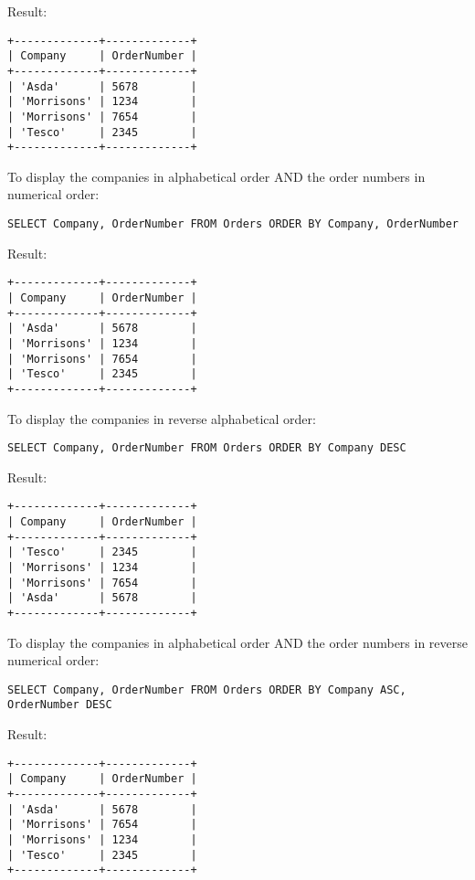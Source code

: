 \documentclass{howto}
\begin{document}
Result:
\begin{verbatim}
+-------------+-------------+
| Company     | OrderNumber |
+-------------+-------------+
| 'Asda'      | 5678        |
| 'Morrisons' | 1234        |
| 'Morrisons' | 7654        |
| 'Tesco'     | 2345        |
+-------------+-------------+
\end{verbatim}


To display the companies in alphabetical order AND the order numbers in numerical order:
\begin{verbatim}
SELECT Company, OrderNumber FROM Orders ORDER BY Company, OrderNumber
\end{verbatim}

Result:
\begin{verbatim}
+-------------+-------------+
| Company     | OrderNumber |
+-------------+-------------+
| 'Asda'      | 5678        |
| 'Morrisons' | 1234        |
| 'Morrisons' | 7654        |
| 'Tesco'     | 2345        |
+-------------+-------------+
\end{verbatim}


To display the companies in reverse alphabetical order:

\begin{verbatim}
SELECT Company, OrderNumber FROM Orders ORDER BY Company DESC
\end{verbatim}

Result:
\begin{verbatim}
+-------------+-------------+
| Company     | OrderNumber |
+-------------+-------------+
| 'Tesco'     | 2345        |
| 'Morrisons' | 1234        |
| 'Morrisons' | 7654        |
| 'Asda'      | 5678        |
+-------------+-------------+
\end{verbatim}


To display the companies in alphabetical order AND the order numbers in reverse numerical order:
\begin{verbatim}
SELECT Company, OrderNumber FROM Orders ORDER BY Company ASC, OrderNumber DESC
\end{verbatim}

Result:
\begin{verbatim}
+-------------+-------------+
| Company     | OrderNumber |
+-------------+-------------+
| 'Asda'      | 5678        |
| 'Morrisons' | 7654        |
| 'Morrisons' | 1234        |
| 'Tesco'     | 2345        |
+-------------+-------------+
\end{verbatim}
\end{document}
